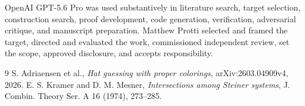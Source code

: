 \documentclass[11pt]{article}
\begin{document}
OpenAI GPT-5.6 Pro was used substantively in literature search, target
selection, construction search, proof development, code generation,
verification, adversarial critique, and manuscript preparation. Matthew
Protti selected and framed the target, directed and evaluated the work,
commissioned independent review, set the scope, approved disclosure, and
accepts responsibility.

\begin{thebibliography}{9}
S. Adriaensen et al., \emph{Hat guessing with proper colorings},
arXiv:2603.04909v4, 2026.
E. S. Kramer and D. M. Mesner, \emph{Intersections among Steiner systems},
J. Combin. Theory Ser. A 16 (1974), 273--285.
\end{thebibliography}
\end{document}
